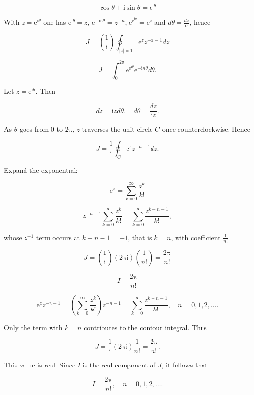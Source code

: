\documentclass[11pt,a4paper]{article}
\theoremstyle{definition}
\theoremstyle{plain}
\begin{document}
\begin{equation}
\cos \theta + \mathrm{i}\sin \theta = \mathrm{e}^{\mathrm{i}\theta}
\end{equation}

With $z = \mathrm{e}^{\mathrm{i}\theta}$ one has $\mathrm{e}^{\mathrm{i}\theta} = z$, $\mathrm{e}^{-\mathrm{i}n\theta} = z^{-n}$, $\mathrm{e}^{\mathrm{e}^{\mathrm{i}\theta}} = \mathrm{e}^{z}$ and $d\theta = \frac{dz}{\mathrm{i}z}$, hence



\[
J = \left(\frac{1}{\mathrm{i}}\right)\oint_{\vert{}z\vert{} = 1}\mathrm{e}^{z}z^{-n - 1}dz
\]

\[
J = \int_{0}^{2\mathrm{\pi}}\mathrm{e}^{\mathrm{e}^{\mathrm{i}\theta}}\mathrm{e}^{-\mathrm{i}n\theta} d\theta .
\]

Let $z = \mathrm{e}^{\mathrm{i}\theta}$. Then

\begin{equation}
dz = \mathrm{i}z d\theta, \quad d\theta = \frac{dz}{\mathrm{i}z}.
\end{equation}

As $\theta$ goes from 0 to $2\mathrm{\pi}$, $z$ traverses the unit circle $C$ once counterclockwise. Hence

\begin{equation}
J = \frac{1}{\mathrm{i}}\oint_{C}\mathrm{e}^{z}z^{-n - 1} dz.
\end{equation}

Expand the exponential:

\begin{equation}
\mathrm{e}^{z} = \sum_{k = 0}^{\infty}\frac{z^{k}}{k!}
\end{equation}

\[
z^{-n - 1}\sum_{k = 0}^{\infty}\frac{z^{k}}{k!} = \sum_{k = 0}^{\infty}\frac{z^{k - n - 1}}{k!} ,
\]



whose $z^{-1}$ term occurs at $k - n - 1 = -1$, that is $k = n$, with coefficient $\frac{1}{n!}$.

\[
J = \left(\frac{1}{\mathrm{i}}\right)(2\mathrm{\pi}\mathrm{i})(\frac{1}{n!}) = \frac{2\mathrm{\pi}}{n!}
\]

\[
I = \frac{2\mathrm{\pi}}{n!}
\]

\[
\mathrm{e}^{z}z^{-n - 1} = \left(\sum_{k = 0}^{\infty}\frac{z^{k}}{k!}\right)z^{-n - 1} = \sum_{k = 0}^{\infty}\frac{z^{k - n - 1}}{k!}, \quad n = 0, 1, 2, \dots .
\]

Only the term with $k = n$ contributes to the contour integral. Thus

\begin{equation}
J = \frac{1}{\mathrm{i}}(2\mathrm{\pi}\mathrm{i})\frac{1}{n!} = \frac{2\mathrm{\pi}}{n!}.
\end{equation}

This value is real. Since $I$ is the real component of $J$, it follows that

\begin{equation}
I = \frac{2\mathrm{\pi}}{n!}, \quad n = 0, 1, 2, \dots .
\end{equation}
\end{document}
